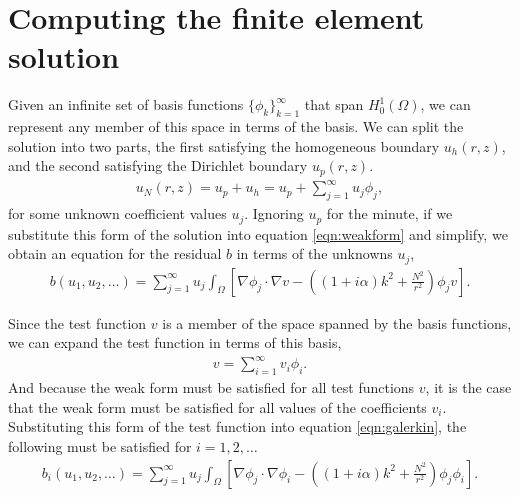 
\section{Computing the finite element solution}

\iffalse
Write in residual form
- don't be equal to 0, easier to write equations.

.We're given an infinite basis.
.Expand the solution in terms of the basis functions.
.Substitute this sum into the weak form.
.Represent test functions as sum of basis functions (Galerkin).
Perform truncation of the series.
Compute the weighted residual using numerical integration.
Compute the Jacobian matrix.
Solve the linear system (MG).
Obtain the finite element solution.
\fi

Given an infinite set of basis functions $\{ \phi_k \}_{k=1}^\infty$ that span $H^1_0(\Omega)$, we can represent any member of this space in terms of the basis.
We can split the solution into two parts, the first satisfying the homogeneous boundary $u_h(r,z)$, and the second satisfying the Dirichlet boundary $u_p(r,z)$.
\begin{align}
	u_N(r,z) = u_p + u_h = u_p + \sum_{j=1}^\infty u_j \phi_j,
\end{align}
for some unknown coefficient values $u_j$.
Ignoring $u_p$ for the minute, if we substitute this form of the solution into equation \eqref{eqn:weakform} and simplify, we obtain an equation for the residual $b$ in terms of the unknowns $u_j$,
\begin{align}
	b(u_1,u_2,\ldots) = \sum_{j=1}^\infty u_j \int_\Omega \left[ \nabla \phi_j \cdot \nabla v - \left( (1+i\alpha)k^2 + \frac{N^2}{r^2}\right) \phi_j v \right]. \label{eqn:galerkin}
\end{align}

Since the test function $v$ is a member of the space spanned by the basis functions, we can expand the test function in terms of this basis,
\begin{align}
	v = \sum_{i=1}^\infty v_i \phi_i.
\end{align}
And because the weak form must be satisfied for all test functions $v$, it is the case that the weak form must be satisfied for all values of the coefficients $v_i$.
Substituting this form of the test function into equation \eqref{eqn:galerkin}, the following must be satisfied for $i=1,2,\ldots$
\begin{align}
	b_i(u_1,u_2,\ldots)=\sum_{j=1}^\infty u_j \int_\Omega \left[ \nabla \phi_j \cdot \nabla \phi_i - \left( (1+i\alpha)k^2 + \frac{N^2}{r^2}\right) \phi_j \phi_i \right].
\end{align}


